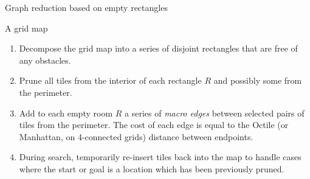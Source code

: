 \begin{algorithm}
\caption{Graph reduction based on empty rectangles}
\label{alg:rsr}
\begin{algorithmic}
\REQUIRE A grid map 
\begin{enumerate}
\item{\label{alg:rsr:1} Decompose the grid map into a series of disjoint rectangles that are free of any obstacles.}
\item{\label{alg:rsr:2} Prune all tiles from the interior of each rectangle $R$
and possibly some from the perimeter.}
\item{\label{alg:rsr:3} Add to each empty room $R$ a series of \emph{macro edges} between 
selected pairs of tiles from the perimeter. The cost of each edge is equal to
the Octile (or Manhattan, on 4-connected grids) distance between endpoints.}
\item{\label{alg:rsr:4} During search, temporarily re-insert tiles back into the map to handle cases where the
start or goal is a location which has been previously pruned.}
\end{enumerate}
\end{algorithmic}
\end{algorithm}
